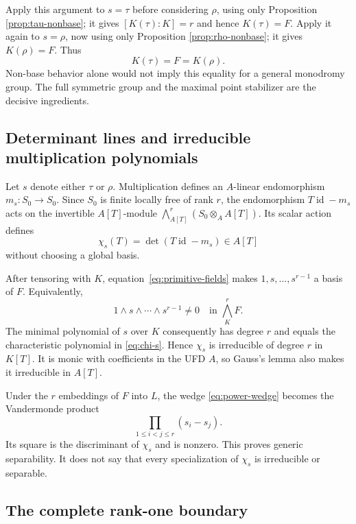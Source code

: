 \documentclass[11pt]{article}
\theoremstyle{definition}
\theoremstyle{remark}
\newcommand{\id}{\operatorname{id}}
\begin{document}
Apply this argument to $s=\tau$ before considering $\rho$, using only Proposition
\ref{prop:tau-nonbase}; it gives $[K(\tau):K]=r$ and hence
$K(\tau)=F$.  Apply it again to $s=\rho$, now using only Proposition
\ref{prop:rho-nonbase}; it gives $K(\rho)=F$.  Thus
\begin{equation}\label{eq:primitive-fields}
 \boxed{K(\tau)=F=K(\rho).}
\end{equation}
Non-base behavior alone would not imply this equality for a general
monodromy group.  The full symmetric group and the maximal point stabilizer
are the decisive ingredients.

\subsection{Determinant lines and irreducible multiplication polynomials}

Let $s$ denote either $\tau$ or $\rho$.  Multiplication defines an
$A$-linear endomorphism $m_s:S_0\to S_0$.  Since $S_0$ is finite locally
free of rank $r$, the endomorphism $T\id-m_s$ acts on the invertible
$A[T]$-module
$\bigwedge_{A[T]}^r(S_0\otimes_AA[T])$.  Its scalar action defines
\begin{equation}\label{eq:chi-s}
 \chi_s(T)=\det(T\id-m_s)\in A[T]
\end{equation}
without choosing a global basis.

After tensoring with $K$, equation~\eqref{eq:primitive-fields} makes
$1,s,\ldots,s^{r-1}$ a basis of $F$.  Equivalently,
\begin{equation}\label{eq:power-wedge}
 1\wedge s\wedge\cdots\wedge s^{r-1}\ne 0
 \quad\text{in }\bigwedge_K^rF.
\end{equation}
The minimal polynomial of $s$ over $K$ consequently has degree $r$ and
equals the characteristic polynomial in \eqref{eq:chi-s}.  Hence $\chi_s$
is irreducible of degree $r$ in $K[T]$.  It is monic with coefficients in
the UFD $A$, so Gauss's lemma also makes it irreducible in $A[T]$.

Under the $r$ embeddings of $F$ into $L$, the wedge
\eqref{eq:power-wedge} becomes the Vandermonde product
\begin{equation}\label{eq:vandermonde}
 \prod_{1\leq i<j\leq r}(s_i-s_j).
\end{equation}
Its square is the discriminant of $\chi_s$ and is nonzero.  This proves
generic separability.  It does not say that every specialization of
$\chi_s$ is irreducible or separable.

\subsection{The complete rank-one boundary}
\end{document}
